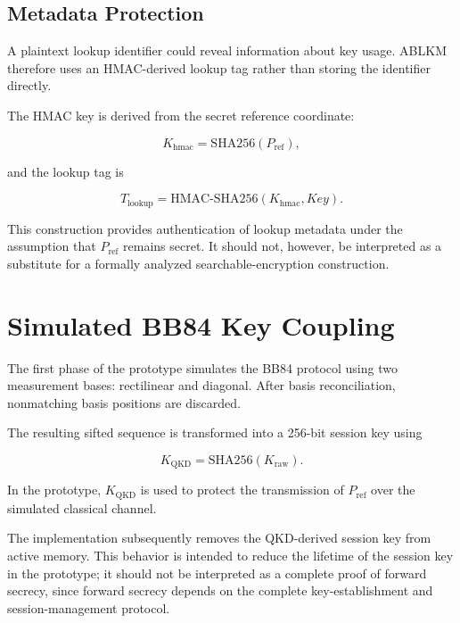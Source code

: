 \documentclass[journal,twocolumn]{IEEEtran}
\begin{document}
\subsection{Metadata Protection}

A plaintext lookup identifier could reveal information about key usage. ABLKM therefore uses an HMAC-derived lookup tag rather than storing the identifier directly.

The HMAC key is derived from the secret reference coordinate:

\begin{equation}
K_{\mathrm{hmac}}=
\mathrm{SHA256}(P_{\mathrm{ref}}),
\end{equation}

and the lookup tag is

\begin{equation}
T_{\mathrm{lookup}}=
\mathrm{HMAC\text{-}SHA256}
(K_{\mathrm{hmac}},Key).
\end{equation}

This construction provides authentication of lookup metadata under the assumption that $P_{\mathrm{ref}}$ remains secret. It should not, however, be interpreted as a substitute for a formally analyzed searchable-encryption construction.

\section{Simulated BB84 Key Coupling}

The first phase of the prototype simulates the BB84 protocol using two measurement bases: rectilinear and diagonal. After basis reconciliation, nonmatching basis positions are discarded.

The resulting sifted sequence is transformed into a 256-bit session key using

\begin{equation}
K_{\mathrm{QKD}}=
\mathrm{SHA256}(K_{\mathrm{raw}}).
\end{equation}

In the prototype, $K_{\mathrm{QKD}}$ is used to protect the transmission of $P_{\mathrm{ref}}$ over the simulated classical channel.

The implementation subsequently removes the QKD-derived session key from active memory. This behavior is intended to reduce the lifetime of the session key in the prototype; it should not be interpreted as a complete proof of forward secrecy, since forward secrecy depends on the complete key-establishment and session-management protocol.
\end{document}
